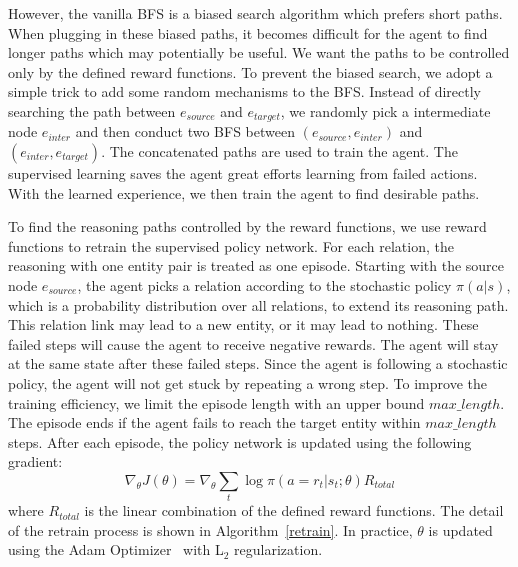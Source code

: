 \documentclass[11pt,letterpaper]{article}
\begin{document}
However, the vanilla BFS is a biased search algorithm which prefers short paths. When plugging in these biased paths, it becomes difficult for the agent to find longer paths which may potentially be useful. We want the paths to be controlled only by the defined reward functions. To prevent the biased search, we adopt a simple trick to add some random mechanisms to the BFS. Instead of directly searching the path between $e_{source}$ and $e_{target}$, we randomly pick a intermediate node $e_{inter}$ and then conduct two BFS between $(e_{source},e_{inter})$ and $(e_{inter},e_{target})$. The concatenated paths are used to train the agent. The supervised learning saves the agent great efforts learning from failed actions. With the learned experience, we then train the agent to find desirable paths.


 To find the reasoning paths controlled by the reward functions, we use reward functions to retrain the supervised policy network. For each relation, the reasoning with one entity pair is treated as one episode. Starting with the source node $e_{source}$, the agent picks a relation according to the stochastic policy $\pi(a|s)$, which is a probability distribution over all relations, to extend its reasoning path. This relation link may lead to a new entity, or it may lead to nothing. These failed steps will cause the agent to receive negative rewards. The agent will stay at the same state after these failed steps. Since the agent is following a stochastic policy, the agent will not get stuck by repeating a wrong step. To improve the training efficiency, we limit the episode length with an upper bound $max\_length$. The episode ends if the agent fails to reach the target entity within $max\_length$ steps. After each episode, the policy network is updated using the following gradient:
\begin{equation}
\nabla_{\theta}J(\theta) = \nabla_{\theta}\sum_t \log{\pi(a=r_t|s_t;\theta)}R_{total}
\end{equation}
where $R_{total}$ is the linear combination of the defined reward functions. The detail of the retrain process is shown in Algorithm~\ref{retrain}. In practice, $\theta$ is updated using the Adam Optimizer~\cite{kingma2014adam} with L$_2$ regularization.
\end{document}
